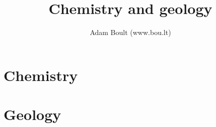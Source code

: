 \documentclass[oneside]{book}
\begin{document}
\author{Adam Boult (www.bou.lt)}
\title{Chemistry and geology}
\maketitle

\setcounter{tocdepth}{0}
\tableofcontents



\part{Chemistry}







\part{Geology}

\end{document}
